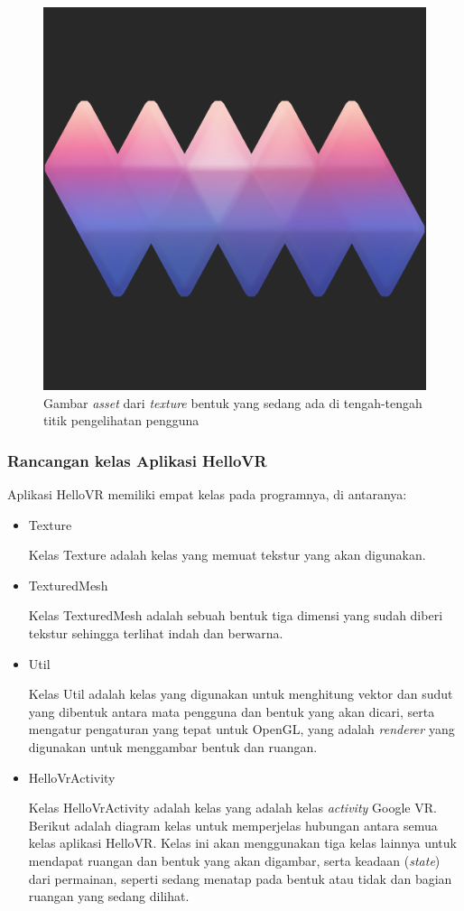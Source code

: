 \begin{figure}[h]
	\centering
		\includegraphics[scale=0.4]{Gambar/shape_pink.png}
	\caption{Gambar \textit{asset} dari \textit{texture} bentuk yang sedang ada di tengah-tengah titik pengelihatan pengguna}
	\label{fig:pink-shape}
\end{figure}

\subsubsection{Rancangan kelas Aplikasi HelloVR}
Aplikasi HelloVR memiliki empat kelas pada programnya, di antaranya: 
\begin{itemize}
	\item Texture
	
	Kelas Texture adalah kelas yang memuat tekstur yang akan digunakan.
	\item TexturedMesh
	
	Kelas TexturedMesh adalah sebuah bentuk tiga dimensi yang sudah diberi tekstur sehingga terlihat indah dan berwarna.
	\item Util
	
	Kelas Util adalah kelas yang digunakan untuk menghitung vektor dan sudut yang dibentuk antara mata pengguna dan bentuk yang akan dicari, serta mengatur pengaturan yang tepat untuk OpenGL, yang adalah {\it renderer} yang digunakan untuk menggambar bentuk dan ruangan.
	\item HelloVrActivity
	
	Kelas HelloVrActivity adalah kelas yang adalah kelas {\it activity} Google VR. Berikut adalah diagram kelas untuk memperjelas hubungan antara semua kelas aplikasi HelloVR. Kelas ini akan menggunakan tiga kelas lainnya untuk mendapat ruangan dan bentuk yang akan digambar, serta keadaan ({\it state}) dari permainan, seperti sedang menatap pada bentuk atau tidak dan bagian ruangan yang sedang dilihat.
\end{itemize}


